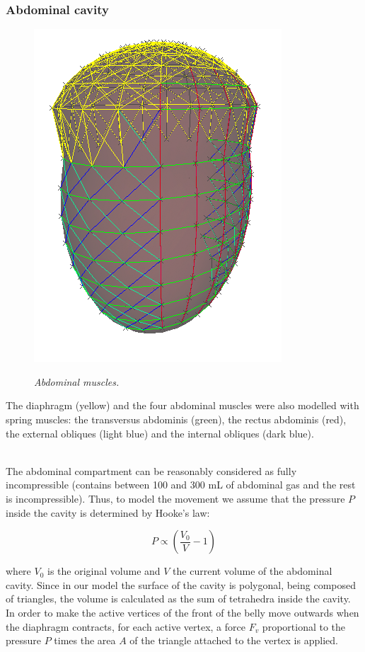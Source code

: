\documentclass[boxedsections ,landscape, a0]{sciposter_v2}
\begin{document}
\begin{multicols}{4}
	\subsubsection{Abdominal cavity}
	
\begin{figure}
\vspace{-2.5\bigskipamount}
  \begin{center}
    \includegraphics[width=0.4\columnwidth]{imgs/abdo_mus}
    
     \emph{Abdominal muscles.}
  \end{center}
\end{figure}

The diaphragm (yellow) and the four abdominal muscles were also modelled with spring muscles: the transversus abdominis (green), the rectus abdominis (red), the external obliques (light blue) and the internal obliques (dark blue).
\
\\
\

The abdominal compartment can be reasonably considered as fully incompressible (contains between 100 and 300 mL of abdominal gas and the
rest is incompressible). Thus, to model the movement we assume that the pressure $P$ inside the cavity is determined by Hooke's law:

\begin{equation}P \propto \left(\frac{V_{0}}{V} - 1\right) \end{equation}

where $V_{0}$ is the original volume and $V$ the current volume of the abdominal cavity. Since in our model the surface of the cavity is polygonal, being composed of triangles, the volume is calculated as the sum of tetrahedra inside the cavity. In order to make the active vertices of the front of the belly move outwards when the diaphragm contracts, for each active vertex, a force $F_{v}$ proportional to the pressure $P$ times the area $A$ of the triangle attached to the vertex is applied.


\end{multicols}
\end{document}
